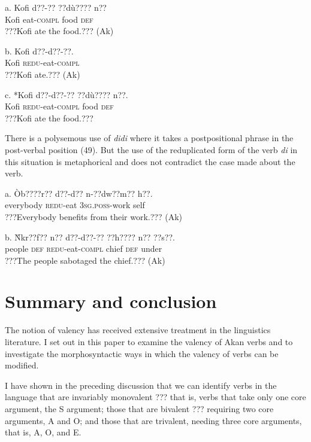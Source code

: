 \documentclass[output=paper]{langsci/langscibook}
\begin{document}
\ea
\gll a.  Kofi  d??-??    ??d\`{u}????    n??\\
       Kofi  eat-\textsc{compl}  food    \textsc{def}\\
\glt   ???Kofi ate the food.??? (Ak)
\z

\ea
\gll  b.  Kofi  d??-d??-??.\\
       Kofi  \textsc{redu}{}-eat-\textsc{compl}\\
\glt   ???Kofi ate.??? (Ak)
\z

\ea
\gll  c.  *Kofi  d??-d??-??      ??d\`{u}????    n??.\\
       Kofi  \textsc{redu}{}-eat-\textsc{compl}  food    \textsc{def}\\
\glt   ???Kofi ate the food.???
\z

There is a polysemous use of \emph{didi} where it takes a postpositional phrase in the post-verbal position (49). But the use of the reduplicated form of the verb \emph{di} in this situation is metaphorical and does not contradict the case made about the verb.

\ea
\gll a.  \`{O}b????r??    d??-d??    n-??dw??m??    h??.\\
       everybody  \textsc{redu}{}-eat  \textsc{3sg.poss}{}-work  self\\
\glt   ???Everybody benefits from their work.??? (Ak)
\z

\ea
\gll  b.  \`{N}kr??f??  n??  d??-d??-??      ??h????   n??  ??s??.\\
       people  \textsc{def}  \textsc{redu}{}-eat-\textsc{compl}  chief  \textsc{def}  under\\
\glt   ???The people sabotaged the chief.??? (Ak)
\z

\section{Summary and conclusion}

The notion of valency has received extensive treatment in the linguistics literature. I set out in this paper to examine the valency of Akan verbs and to investigate the morphosyntactic ways in which the valency of verbs can be modified. 

I have shown in the preceding discussion that we can identify verbs in the language that are invariably monovalent ??? that is, verbs that take only one core argument, the S argument; those that are bivalent ??? requiring two core arguments, A and O; and those that are trivalent, needing three core arguments, that is, A, O, and E.
\end{document}
